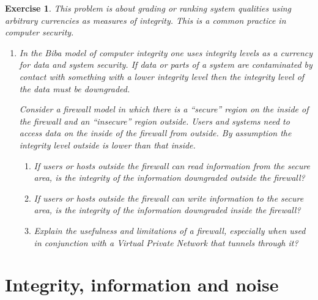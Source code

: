 \documentclass{book}
\newtheorem{exercise}{Exercise}
\begin{document}
\begin{exercise} 
This problem is about grading or ranking system qualities using arbitrary currencies as
measures of integrity. This is a common practice in computer security.
\begin{enumerate}
\item In the Biba model of computer integrity one uses integrity levels as a currency
for data and system security.  If data or parts of a system are
contaminated by contact with something with a lower integrity level
then the integrity level of the data must be downgraded.

Consider a firewall model in which there is a ``secure'' region on the inside of the firewall
and an ``insecure'' region outside. Users and systems need to access
data on the inside of the firewall from outside. By assumption the
integrity level outside is lower than that inside.
\begin{enumerate}
\item If users or hosts outside the firewall can read information from the secure area, is
the integrity of the information downgraded outside the firewall?

\item If users or hosts outside the firewall can write information to the secure area, is
the integrity of the information downgraded inside the firewall?
\item Explain the usefulness and limitations of a firewall, especially when used in
conjunction with a Virtual Private Network that tunnels through it?
\end{enumerate}
\end{enumerate}
\end{exercise}
\begin{solution}
\end{solution}




\chapter{Integrity, information and noise}
\end{document}
